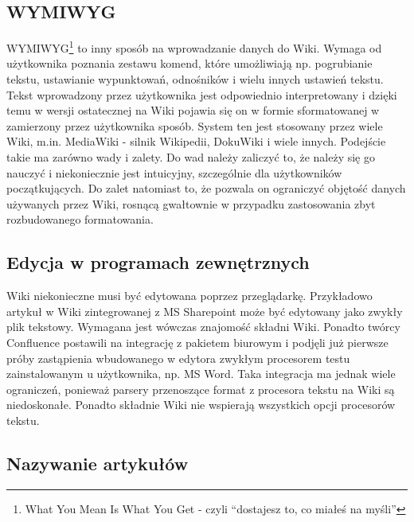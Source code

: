 \documentclass{article}
\begin{document}
	\subsection{WYMIWYG}
	
WYMIWYG\footnote{What You Mean Is What You Get - czyli ``dostajesz to, co miałeś na myśli''} to inny sposób na wprowadzanie danych do Wiki. Wymaga od użytkownika poznania zestawu komend, które umożliwiają np. pogrubianie tekstu, ustawianie wypunktowań, odnośników i wielu innych ustawień tekstu. Tekst wprowadzony przez użytkownika jest odpowiednio interpretowany i dzięki temu w wersji ostatecznej na Wiki pojawia się on w formie sformatowanej w zamierzony przez użytkownika sposób. System ten jest stosowany przez wiele Wiki, m.in. MediaWiki - silnik Wikipedii, DokuWiki i wiele innych. Podejście takie ma zarówno wady i zalety. Do wad należy zaliczyć to, że należy się go nauczyć i niekoniecznie jest intuicyjny, szczególnie dla użytkowników początkujących. Do zalet natomiast to, że pozwala on ograniczyć objętość danych używanych przez Wiki, rosnącą gwałtownie w przypadku zastosowania zbyt rozbudowanego formatowania.

	\subsection{Edycja w programach zewnętrznych}

Wiki niekonieczne musi być edytowana poprzez przeglądarkę. Przykładowo artykuł w Wiki zintegrowanej z MS Sharepoint może być edytowany jako zwykły plik tekstowy. Wymagana jest wówczas znajomość składni Wiki. Ponadto twórcy Confluence postawili na integrację z pakietem biurowym i podjęli już pierwsze próby zastąpienia wbudowanego w edytora zwykłym procesorem testu zainstalowanym u użytkownika, np. MS Word. Taka integracja ma jednak wiele ograniczeń, ponieważ parsery przenoszące format z procesora tekstu na Wiki są niedoskonałe. Ponadto składnie Wiki nie wspierają wszystkich opcji procesorów tekstu. 



	\subsection{Nazywanie artykułów}
\end{document}

